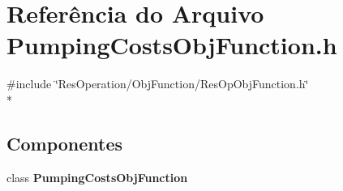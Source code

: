 \section{Referência do Arquivo Pumping\+Costs\+Obj\+Function.\+h}
\label{_obj_function_2_pumping_costs_2_pumping_costs_obj_function_8h}
{\ttfamily \#include \char`\"{}Res\+Operation/\+Obj\+Function/\+Res\+Op\+Obj\+Function.\+h\char`\"{}}\\*
\subsection*{Componentes}
\begin{DoxyCompactItemize}
\item 
class {\bf Pumping\+Costs\+Obj\+Function}
\end{DoxyCompactItemize}
